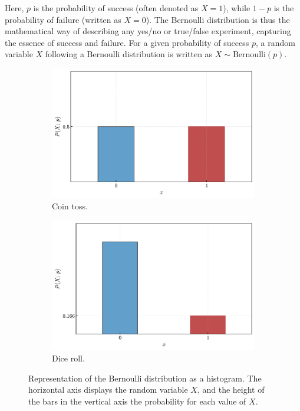 \documentclass{book}
\begin{document}
Here, $p$ is the probability of success (often denoted as $X=1$), while $1-p$ is the probability of failure (written as $X=0$). The Bernoulli distribution is thus the mathematical way of describing any yes/no or true/false experiment, capturing the essence of success and failure. For a given probability of success $p$, a random variable $X$ following a Bernoulli distribution is written as $X \sim \text{Bernoulli}(p)$.

\begin{figure}[ht]
    \centering
    \begin{subfigure}[b]{0.48\textwidth}
        \centering
        \includegraphics[width=\textwidth, height=0.7\textwidth]{figures/chapter2/bernoulli_1.png}
        \caption{Coin toss.}
        \label{fig:bernoulli1}
    \end{subfigure}
    \hfill
    \begin{subfigure}[b]{0.48\textwidth}
        \centering
        \includegraphics[width=\textwidth, height=0.7\textwidth]{figures/chapter2/bernoulli_2.png}
        \caption{Dice roll.}
        \label{fig:bernoulli2}
    \end{subfigure}
    \caption{Representation of the Bernoulli distribution as a histogram. The horizontal axis displays the random variable $X$, and the height of the bars in the vertical axis the probability for each value of $X$.}
    \label{fig:bernoulli_comparison}
\end{figure}
\end{document}
